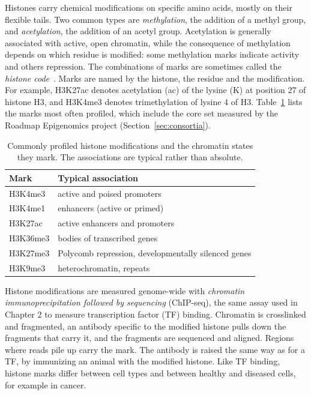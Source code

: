 Histones carry chemical modifications on specific amino acids, mostly on their flexible tails. Two common types are \emph{methylation}, the addition of a methyl group, and \emph{acetylation}, the addition of an acetyl group. Acetylation is generally associated with active, open chromatin, while the consequence of methylation depends on which residue is modified: some methylation marks indicate activity and others repression. The combinations of marks are sometimes called the \emph{histone code}~\citep{strahl2000,kouzarides2007}. Marks are named by the histone, the residue and the modification. For example, H3K27ac denotes acetylation (ac) of the lysine (K) at position 27 of histone H3, and H3K4me3 denotes trimethylation of lysine 4 of H3. Table~\ref{tab:histone_marks} lists the marks most often profiled, which include the core set measured by the Roadmap Epigenomics project (Section~\ref{sec:consortia}).

\begin{table}[t]
  \centering
  \caption{Commonly profiled histone modifications and the chromatin states they mark. The associations are typical rather than absolute.}
  \label{tab:histone_marks}
  \begin{tabular}{ll}
    \toprule
    Mark & Typical association \\
    \midrule
    H3K4me3 & active and poised promoters \\
    H3K4me1 & enhancers (active or primed) \\
    H3K27ac & active enhancers and promoters \\
    H3K36me3 & bodies of transcribed genes \\
    H3K27me3 & Polycomb repression, developmentally silenced genes \\
    H3K9me3 & heterochromatin, repeats \\
    \bottomrule
  \end{tabular}
\end{table}

Histone modifications are measured genome-wide with \emph{chromatin immunoprecipitation followed by sequencing} (ChIP-seq), the same assay used in Chapter 2 to measure transcription factor (TF) binding. Chromatin is crosslinked and fragmented, an antibody specific to the modified histone pulls down the fragments that carry it, and the fragments are sequenced and aligned. Regions where reads pile up carry the mark. The antibody is raised the same way as for a TF, by immunizing an animal with the modified histone. Like TF binding, histone marks differ between cell types and between healthy and diseased cells, for example in cancer.

